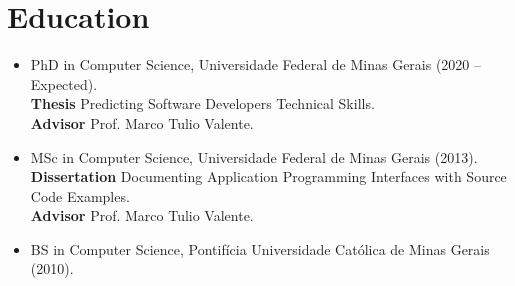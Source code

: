 \section*{Education}
\begin{itemize}
  \item PhD in Computer Science, Universidade Federal de Minas Gerais (2020 -- Expected). \\
  \textbf{Thesis} Predicting Software Developers Technical Skills. \\
  \textbf{Advisor} Prof. Marco Tulio Valente.
  \item MSc in Computer Science, Universidade Federal de Minas Gerais (2013). \\
  \textbf{Dissertation} Documenting Application Programming Interfaces with Source Code Examples. \\
  \textbf{Advisor} Prof. Marco Tulio Valente.
  \item BS in Computer Science, Pontifícia Universidade Católica de Minas Gerais (2010).
\end{itemize}